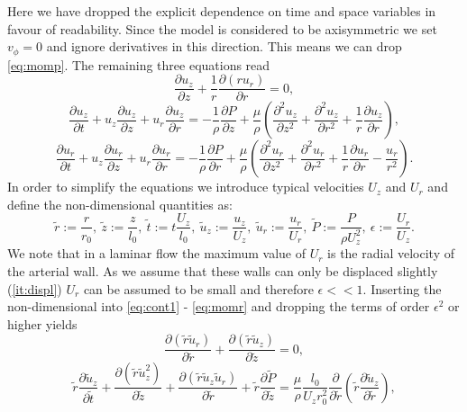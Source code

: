 \documentclass[a4paper, oneside]{discothesis}
\begin{document}
Here we have dropped the explicit dependence on time and space variables in favour of readability.
Since the model is considered to be axisymmetric we set $v_\phi=0$ and ignore derivatives in this direction.
This means we can drop \autoref{eq:momp}.
The remaining three equations read
\begin{equation}
	\frac{\partial u_z}{\partial z} + \frac{1}{r} \frac{\partial (r u_r)}{\partial r} = 0, \label{eq:cont1}
\end{equation}
\begin{equation}
	\frac{\partial u_z}{\partial t} + u_z \frac{\partial u_z}{\partial z} + u_r \frac{\partial u_z}{\partial r} = -\frac{1}{\rho} \frac{\partial P}{\partial z} + \frac{\mu}{\rho} \left( \frac{\partial^2 u_z}{\partial z^2} + \frac{\partial^2 u_z}{\partial r^2} + \frac{1}{r} \frac{\partial u_z}{\partial r} \right),
\end{equation}
\begin{equation}
	\frac{\partial u_r}{\partial t} + u_z \frac{\partial u_r}{\partial z} + u_r \frac{\partial u_r}{\partial r} = -\frac{1}{\rho} \frac{\partial P}{\partial r} + \frac{\mu}{\rho} \left( \frac{\partial^2 u_r}{\partial z^2} + \frac{\partial^2 u_r}{\partial r^2} + \frac{1}{r} \frac{\partial u_r}{\partial r} - \frac{u_r}{r^2}\right). \label{eq:momr}
\end{equation}
In order to simplify the equations we introduce typical velocities $U_z$ and $U_r$ and define the non-dimensional quantities as:
\begin{equation}
	\tilde{r} := \frac{r}{r_0}, \ \tilde{z} := \frac{z}{l_0}, \ \tilde{t} := t \frac{U_z}{l_0}, \ \tilde{u}_z := \frac{u_z}{U_z}, \ \tilde{u}_r := \frac{u_r}{U_r}, \ \tilde{P} := \frac{P}{\rho U_z^2}, \ \epsilon := \frac{U_r}{U_z}.
\end{equation}
We note that in a laminar flow the maximum value of $U_r$ is the radial velocity of the arterial wall.
As we assume that these walls can only be displaced slightly (\autoref{it:displ}) $U_r$ can be assumed to be small and therefore $\epsilon << 1$. \cite{womersley1957elastic}
Inserting the non-dimensional into \autoref{eq:cont1} - \autoref{eq:momr} and dropping the terms of order $\epsilon^2$ or higher yields
\begin{equation}
	\frac{\partial (\tilde{r} \tilde{u}_r)}{\partial \tilde{r}} + \frac{\partial (\tilde{r} \tilde{u}_z)}{\partial\tilde{z}} = 0, \label{eq:cont2}
\end{equation}
\begin{equation}
	\tilde{r} \frac{\partial \tilde{u}_z}{\partial \tilde{t}} + \frac{ \partial (\tilde{r} \tilde{u}_z^2)}{\partial \tilde{z}} + \frac{ \partial (\tilde{r} \tilde{u}_z \tilde{u}_r)}{\partial \tilde{r}} + \tilde{r} \frac{\partial \tilde{P}}{\partial \tilde{z}} = \frac{\mu}{\rho} \frac{l_0}{U_z r_0^2} \frac{\partial}{\partial \tilde{r}} \left( \tilde{r} \frac{\partial \tilde{u}_z}{\partial \tilde{r}} \right), \label{eq:momz}
\end{equation}
\end{document}
